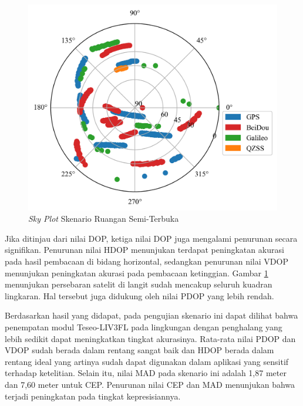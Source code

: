 \begin{figure}[H]
	\centering
	\captionsetup{justification=centering}
	\includegraphics[width=12cm]{contents/chapter-4/3-skenario-semioutdoor/sky_plot.png}
	\caption{\textit{Sky Plot} Skenario Ruangan Semi-Terbuka}
	\label{Fig: semioutdoor-sky_plot}
\end{figure}


Jika ditinjau dari nilai DOP, ketiga nilai DOP juga mengalami penurunan secara signifikan. Penurunan nilai HDOP menunjukan terdapat peningkatan akurasi pada hasil pembacaan di bidang horizontal, sedangkan penurunan nilai VDOP menunjukan peningkatan akurasi pada pembacaan ketinggian. Gambar \ref{Fig: semioutdoor-sky_plot} menunjukan persebaran satelit di langit sudah mencakup seluruh kuadran lingkaran. Hal tersebut juga didukung oleh nilai PDOP yang lebih rendah.

Berdasarkan hasil yang didapat, pada pengujian skenario ini dapat dilihat bahwa penempatan modul Teseo\hyp{}LIV3FL pada lingkungan dengan penghalang yang lebih sedikit dapat meningkatkan tingkat akurasinya. Rata-rata nilai PDOP dan VDOP sudah berada dalam rentang sangat baik dan HDOP berada dalam rentang ideal yang artinya sudah dapat digunakan dalam aplikasi yang sensitif terhadap ketelitian. Selain itu, nilai MAD pada skenario ini adalah 1,87 meter dan 7,60 meter untuk CEP. Penurunan nilai CEP dan MAD menunjukan bahwa terjadi peningkatan pada tingkat kepresisiannya.

